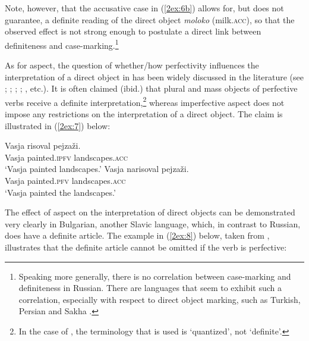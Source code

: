 \documentclass[output=paper]{langsci/langscibook}
\begin{document}
Note, however, that the accusative case in (\ref{2ex:6b}) allows for, but does not guarantee, a definite reading of the direct object {\emph{moloko}} (milk.{\textsc{acc}}), so that the observed effect is not strong enough to postulate a direct link between definiteness and case-marking.\footnote{{Speaking more generally, there is no correlation between case-marking and definiteness in Russian. There are languages that seem to exhibit such a correlation, especially with respect to direct object marking, such as Turkish, Persian \citep{comrie:81} and Sakha \citep{baker:15}.}}

As for aspect, the question of whether/how perfectivity influences the interpretation of a direct object in  has been widely discussed in the literature (see \citealt{wierzbicka:67}; \citealt{krifka:92}; \citealt{schoorlemmer:95}; \citealt{verkuyl:98}; \citealt{filip:99}, etc.). It is often claimed (ibid.) that plural and mass objects of perfective verbs receive a definite interpretation,\footnote{In the case of \cite{verkuyl:98}, the terminology that is used is `quantized', not `definite'.} whereas imperfective aspect does not impose any restrictions on the interpretation of a direct object. The claim is illustrated in (\ref{2ex:7}) below:

\begin{exe}
\ex\label{2ex:7}
	\begin{xlista}
	\ex\label{2ex:7a}
	\gll	Vasja 	risoval 			pejza\v{z}i. \\
		Vasja 	painted.{\textsc{ipfv}} 	landscapes.{\textsc{acc}} \\
	\glt	`Vasja painted landscapes.'
	\ex\label{2ex:7b}
	\gll	Vasja 	narisoval 			pejza\v{z}i. \\
		Vasja 	painted.{\textsc{pfv}} 	landscapes.{\textsc{acc}} \\
	\glt	`Vasja painted the landscapes.'
	\end{xlista}
\end{exe}

The effect of aspect on the interpretation of direct objects can be demonstrated very clearly in Bulgarian, another Slavic language, which, in contrast to Russian, does have a definite article. The example in (\ref{2ex:8}) below, taken from \cite[][944]{dimitrova:vulchanova:12}, illustrates that the definite article cannot be omitted if the verb is perfective: 
\end{document}
